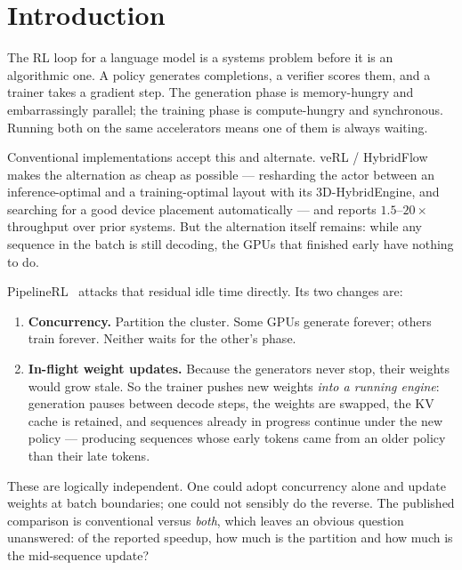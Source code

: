 \documentclass[11pt]{article}
\begin{document}
\section{Introduction}

The RL loop for a language model is a systems problem before it is an algorithmic one. A
policy generates completions, a verifier scores them, and a trainer takes a gradient step.
The generation phase is memory-hungry and embarrassingly parallel; the training phase is
compute-hungry and synchronous. Running both on the same accelerators means one of them is
always waiting.

Conventional implementations accept this and alternate. veRL / HybridFlow~\cite{verl}
makes the alternation as cheap as possible --- resharding the actor between an
inference-optimal and a training-optimal layout with its 3D-HybridEngine, and searching for a
good device placement automatically --- and reports $1.5$--$20\times$ throughput over prior
systems. But the alternation itself remains: while any sequence in the batch is still
decoding, the GPUs that finished early have nothing to do.

PipelineRL~\cite{pipelinerl} attacks that residual idle time directly. Its two changes are:

\begin{enumerate}
\item \textbf{Concurrency.} Partition the cluster. Some GPUs generate forever; others train
forever. Neither waits for the other's phase.
\item \textbf{In-flight weight updates.} Because the generators never stop, their weights
would grow stale. So the trainer pushes new weights \emph{into a running engine}: generation
pauses between decode steps, the weights are swapped, the KV cache is retained, and sequences
already in progress continue under the new policy --- producing sequences whose early tokens
came from an older policy than their late tokens.
\end{enumerate}

These are logically independent. One could adopt concurrency alone and update weights at
batch boundaries; one could not sensibly do the reverse. The published comparison is
conventional versus \emph{both}, which leaves an obvious question unanswered: of the reported
speedup, how much is the partition and how much is the mid-sequence update?
\end{document}
